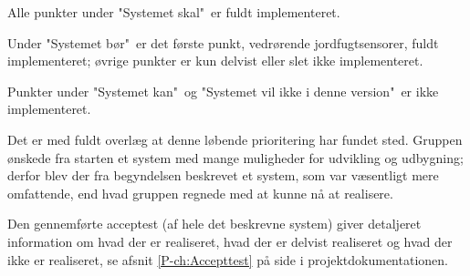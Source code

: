 Alle punkter under "Systemet skal"\ er fuldt implementeret. 

Under "Systemet bør"\ er det første punkt, vedrørende jordfugtsensorer, fuldt implementeret; øvrige punkter er kun delvist eller slet ikke implementeret.

Punkter under "Systemet kan"\ og "Systemet vil ikke i denne version"\ er ikke implementeret. 

Det er med fuldt overlæg at denne løbende prioritering har fundet sted. 
Gruppen ønskede fra starten et system med mange muligheder for udvikling og udbygning; derfor blev der fra begyndelsen beskrevet et system, som var væsentligt mere omfattende, end hvad gruppen regnede med at kunne nå at realisere.

\mbox{}

Den gennemførte acceptest (af hele det beskrevne system) giver detaljeret information om hvad der er realiseret, hvad der er delvist realiseret og hvad der ikke er realiseret, se afsnit \ref{P-ch:Accepttest}  på side \pageref{P-ch:Accepttest} i projektdokumentationen. 


\clearpage